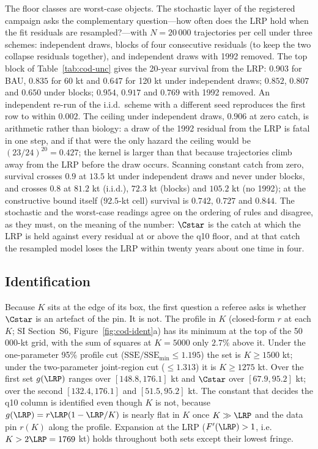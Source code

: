 The floor classes are worst-case objects. The stochastic layer of the registered campaign asks the complementary question---how often does the LRP hold when the fit residuals are resampled?---with $N=20\,000$ trajectories per cell under three schemes: independent draws, blocks of four consecutive residuals (to keep the two collapse residuals together), and independent draws with 1992 removed. The top block of Table~\ref{tab:cod-unc} gives the 20-year survival from the LRP: $0.903$ for BAU, $0.835$ for 60 kt and $0.647$ for 120 kt under independent draws; $0.852$, $0.807$ and $0.650$ under blocks; $0.954$, $0.917$ and $0.769$ with 1992 removed. An independent re-run of the i.i.d.\ scheme with a different seed reproduces the first row to within $0.002$. The ceiling under independent draws, $0.906$ at zero catch, is arithmetic rather than biology: a draw of the 1992 residual from the LRP is fatal in one step, and if that were the only hazard the ceiling would be $(23/24)^{20}=0.427$; the kernel is larger than that because trajectories climb away from the LRP before the draw occurs. Scanning constant catch from zero, survival crosses $0.9$ at $13.5$ kt under independent draws and never under blocks, and crosses $0.8$ at $81.2$ kt (i.i.d.), $72.3$ kt (blocks) and $105.2$ kt (no 1992); at the constructive bound itself ($92.5$-kt cell) survival is $0.742$, $0.727$ and $0.844$. The stochastic and the worst-case readings agree on the ordering of rules and disagree, as they must, on the meaning of the number: $\Cstar$ is the catch at which the LRP is held against every residual at or above the q10 floor, and at that catch the resampled model loses the LRP within twenty years about one time in four.



\subsection{Identification}\label{sec:cod-ident}

Because $K$ sits at the edge of its box, the first question a referee asks is whether $\Cstar$ is an artefact of the pin. It is not. The profile in $K$ (closed-form $r$ at each $K$; SI Section~S6, Figure~\ref{fig:cod-ident}a) has its minimum at the top of the 50\,000-kt grid, with the sum of squares at $K=5000$ only $2.7\%$ above it. Under the one-parameter 95\% profile cut ($\mathrm{SSE}/\mathrm{SSE}_{\min}\le1.195$) the set is $K\ge1500$ kt; under the two-parameter joint-region cut ($\le1.313$) it is $K\ge1275$ kt. Over the first set $g(\LRP)$ ranges over $[148.8,176.1]$ kt and $\Cstar$ over $[67.9,95.2]$ kt; over the second $[132.4,176.1]$ and $[51.5,95.2]$ kt. The constant that decides the q10 column is identified even though $K$ is not, because $g(\LRP)=r\LRP(1-\LRP/K)$ is nearly flat in $K$ once $K\gg\LRP$ and the data pin $r(K)$ along the profile. Expansion at the LRP ($F'(\LRP)>1$, i.e.\ $K>2\LRP=1769$ kt) holds throughout both sets except their lowest fringe.


